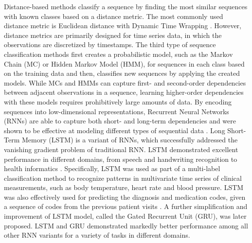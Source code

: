 \documentclass{amia_summit_2018}
\begin{document}
Distance-based methods classify a sequence by finding the most similar sequences with known classes based on a distance metric. The most commonly used distance metric is Euclidean distance with Dynamic Time Wrapping \cite{keogh2000scaling}. However, distance metrics are primarily designed for time series data, in which the observations are discretized by timestamps. The third type of sequence classification methods first creates a probabilistic model, such as the Markov Chain (MC) or Hidden Markov Model \cite{rabiner1989tutorial} (HMM), for sequences in each class based on the training data and then, classifies new sequences by applying the created models. While MCs and HMMs can capture first- and second-order dependencies between adjacent observations in a sequence, learning higher-order dependencies with these models requires prohibitively large amounts of data. By encoding sequences into low-dimensional representations, Recurrent Neural Networks (RNNs) are able to capture both short- and long-term dependencies and were shown to be effective at modeling different types of sequential data \cite{lipton2015critical}. Long Short-Term Memory (LSTM) \cite{hochreiter1997long} is a variant of RNNs, which successfully addressed the vanishing gradient problem \cite{bengio1993problem} of traditional RNN. LSTM demonstrated excellent performance in different domains, from speech \cite{graves2013speech} and handwriting recognition\cite{nion2013handwritten} to health informatics \cite{lipton2015learning, choi2016doctor}. Specifically, LSTM was used as part of a multi-label classification method to recognize patterns in multivariate time series of clinical measurements, such as body temperature, heart rate and blood pressure\cite{lipton2015learning}. LSTM was also effectively used for predicting the diagnosis and medication codes, given a sequence of codes from the previous patient visits \cite{choi2016doctor}. A further simplification and improvement of LSTM model, called the Gated Recurrent
Unit (GRU)\cite{chung2014empirical}, was later proposed. LSTM and GRU demonstrated markedly better performance among all other RNN variants for a variety of tasks in different domains.
  
\end{document}
